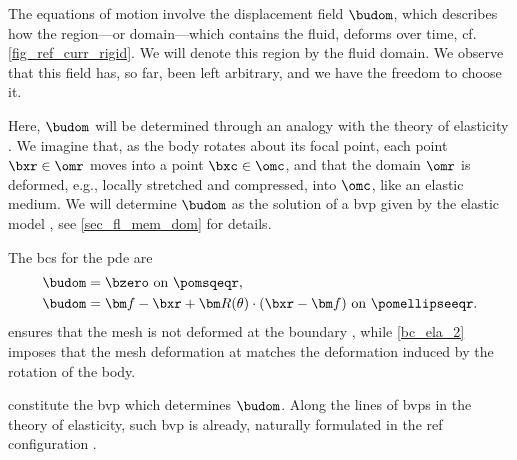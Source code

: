 The equations of motion \crefs{\eqsfluidbodyref} involve the displacement field $\budom$, which describes how the region---or domain---which contains the fluid, deforms over time, cf. \cref{fig_ref_curr_rigid}. We will denote this region by the fluid domain.
We observe that this field has, so far, been left arbitrary, and we have the freedom to choose it.

Here, $\budom$ will be determined through an analogy with the theory of elasticity \cite{kamenskyLectureNotesMAE}. We imagine that, as the  body rotates about its focal point,  each point $\bxr \in \omr$ moves into a point $\bxc \in \omc$, and that the domain $\omr$ is deformed, e.g., locally stretched and compressed, into $\omc$, like an elastic medium. We will determine $\budom$ as the solution of a \ac{bvp} given by the  elastic model  \cite{landauTheoryElasticity1986,kamenskyLectureNotesMAE}, see \cref{sec_fl_mem_dom} for details.


The \acp{bc} for the  \ac{pde}  are
\begin{align}
        \label{bc_ela_1}
        \budom & =\bzero \text{ on } \pomsqeqr,                                                                 \\
        \label{bc_ela_2}
        \budom & = \bfocalpoint - \bxr + {\bm R}(\theta)\cdot (\bxr - \bfocalpoint) \text{ on } \pomellipseeqr.
\end{align}
 ensures that the mesh is not deformed at the boundary \pomsqr, while \cref{bc_ela_2} imposes that the mesh deformation at \pomellipser  matches the deformation induced by the rotation of the body.

 constitute the \ac{bvp} which determines $\budom$. Along the lines of \acp{bvp} in the theory of elasticity, such \ac{bvp} is already, naturally formulated in the \ac{ref} configuration \cite{landauTheoryElasticity1986}.


